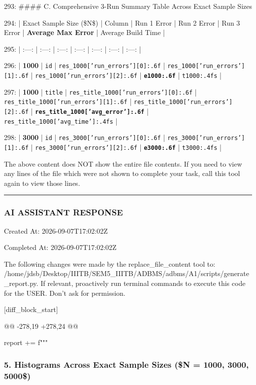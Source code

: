 \documentclass[11pt,a4paper]{article}
\begin{document}
293: \#\#\#\# C. Comprehensive 3-Run Summary Table Across Exact Sample Sizes

294: | Exact Sample Size (\$N\$) | Column | Run 1 Error | Run 2 Error | Run 3 Error | \textbf{Average Max Error} | Average Build Time |

295: | :---: | :---: | :---: | :---: | :---: | :---: | :---: |

296: | \textbf{1000} | \texttt{id} | \texttt{{res\_1000['run\_errors'][0]:.6f}} | \texttt{{res\_1000['run\_errors'][1]:.6f}} | \texttt{{res\_1000['run\_errors'][2]:.6f}} | \textbf{\texttt{{e1000:.6f}}} | \texttt{{t1000:.4f}s} |

297: | \textbf{1000} | \texttt{title} | \texttt{{res\_title\_1000['run\_errors'][0]:.6f}} | \texttt{{res\_title\_1000['run\_errors'][1]:.6f}} | \texttt{{res\_title\_1000['run\_errors'][2]:.6f}} | \textbf{\texttt{{res\_title\_1000['avg\_error']:.6f}}} | \texttt{{res\_title\_1000['avg\_time']:.4f}s} |

298: | \textbf{3000} | \texttt{id} | \texttt{{res\_3000['run\_errors'][0]:.6f}} | \texttt{{res\_3000['run\_errors'][1]:.6f}} | \texttt{{res\_3000['run\_errors'][2]:.6f}} | \textbf{\texttt{{e3000:.6f}}} | \texttt{{t3000:.4f}s} |

The above content does NOT show the entire file contents. If you need to view any lines of the file which were not shown to complete your task, call this tool again to view those lines.


\hrule

\subsubsection{AI ASSISTANT RESPONSE}

Created At: 2026-09-07T17:02:02Z

Completed At: 2026-09-07T17:02:02Z

The following changes were made by the replace\_file\_content tool to: /home/jdsb/Desktop/IIITB/SEM5\_IIITB/ADBMS/adbms/A1/scripts/generate\_report.py. If relevant, proactively run terminal commands to execute this code for the USER. Don't ask for permission.

[diff\_block\_start]

@@ -278,19 +278,24 @@

report += f"""

\subsubsection{5. Histograms Across Exact Sample Sizes (\$N = 1000, 3000, 5000\$)}
\end{document}

